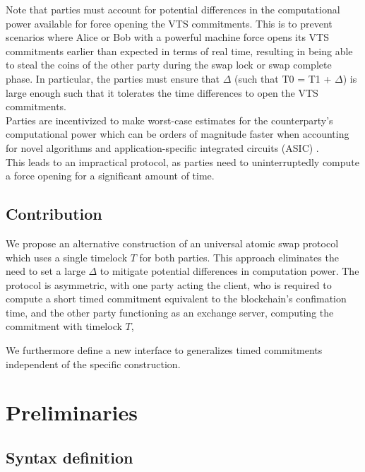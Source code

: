 \documentclass{article}      	%
\begin{document}
Note that parties must account for potential differences in the computational power available for force opening the VTS commitments. This is to prevent scenarios where Alice or Bob with a powerful machine force opens its VTS commitments earlier than expected in terms of real time, resulting in being able 
to steal the coins of the other party during the swap lock or swap complete phase. In particular, the parties must ensure that $\Delta$ (such that T0 = T1 + $\Delta$) is large enough such that it tolerates the time differences to open the VTS commitments. \\

Parties are incentivized to make worst-case estimates for the counterparty's computational power which can be orders of magnitude faster when accounting for novel algorithms \cite{squaring_algo} and application-specific integrated circuits (ASIC) \cite{squaring_asic}. \\
This leads to an impractical protocol, as parties need to uninterruptedly compute a force opening for a significant amount of time.
\subsection{Contribution}

We propose an alternative construction of an universal atomic swap protocol which uses a single timelock $T$ for both parties. This approach eliminates the need to set a large $\Delta$ to mitigate potential differences in computation power. 
The protocol is asymmetric, with one party acting the client, who is required to compute a short timed commitment equivalent to the blockchain's confimation time, and the other party functioning as an exchange server, computing the commitment with timelock $T$,

We furthermore define a new interface to generalizes timed commitments independent of the specific construction.

\section{Preliminaries}


\subsection{Syntax definition}
\end{document}
